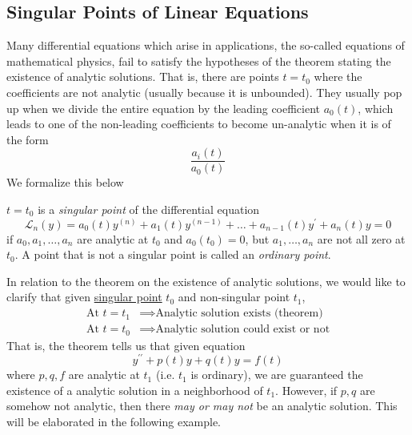 \documentclass{article}
\newcounter{theorem}[section]
\newcounter{definition}[section]
\newcounter{example}[section]
\begin{document}
  \subsection{Singular Points of Linear Equations}

    Many differential equations which arise in applications, the so-called equations of mathematical physics, fail to satisfy the hypotheses of the theorem stating the existence of analytic solutions. That is, there are points $t = t_0$ where the coefficients are not analytic (usually because it is unbounded). They usually pop up when we divide the entire equation by the leading coefficient $a_0 (t)$, which leads to one of the non-leading coefficients to become un-analytic when it is of the form 
    \begin{equation}
      \frac{a_i(t)}{a_0 (t)}
    \end{equation}
    We formalize this below 

    \begin{definition}
      \label{def:singular-point}
    $t = t_0$ is a \textit{singular point} of the differential equation
    \begin{equation}
      \mathcal{L}_n (y) = a_0 (t) y^{(n)} + a_1 (t) y^{(n-1)} + \ldots + a_{n-1} (t) y^\prime + a_n (t) y = 0
    \end{equation}
    if $a_0, a_1, \ldots, a_n$ are analytic at $t_0$ and $a_0 (t_0) = 0$, but $a_1, \ldots, a_n$ are not all zero at $t_0$. A point that is not a singular point is called an \textit{ordinary point}. 
    \end{definition}

    In relation to the theorem on the existence of analytic solutions, we would like to clarify that given \hyperref[def:singular-point]{singular point} $t_0$ and non-singular point $t_1$, 
    \begin{align*}
        \text{At } t = t_1 & \implies \text{Analytic solution exists (theorem)} \\
        \text{At } t = t_0 & \implies \text{Analytic solution could exist or not} 
    \end{align*}
    That is, the theorem tells us that given equation
    \begin{equation}
      y^{\prime\prime} + p(t) y + q(t) y = f(t)
    \end{equation}
    where $p, q, f$ are analytic at $t_1$ (i.e. $t_1$ is ordinary), we are guaranteed the existence of a analytic solution in a neighborhood of $t_1$. However, if $p, q$ are somehow not analytic, then there \textit{may or may not} be an analytic solution. This will be elaborated in the following example. 
\end{document}
